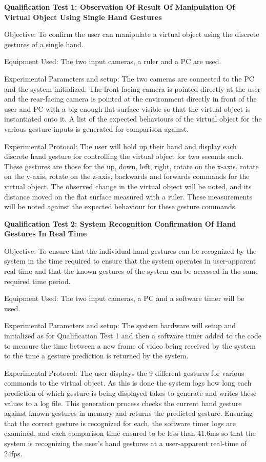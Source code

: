 \textbf{Qualification Test 1: Observation Of Result Of Manipulation Of Virtual Object Using Single Hand Gestures}

Objective: To confirm the user can manipulate a virtual object using the discrete gestures of a single hand.
 
Equipment Used: The two input cameras, a ruler and a PC are used.

Experimental Parameters and setup: The two cameras are connected to the PC and the system initialized. The front-facing camera is pointed directly at the user and the rear-facing camera is pointed at the environment directly in front of the user and PC with a big enough flat surface visible so that the virtual object is instantiated onto it. A list of the expected behaviours of the virtual object for the various gesture inputs is generated for comparison against.

Experimental Protocol: The user will hold up their hand and display each discrete hand gesture for controlling the virtual object for two seconds each. These gestures are those for the up, down, left, right, rotate on the x-axis, rotate on the y-axis, rotate on the z-axis, backwards and forwards commands for the virtual object. The observed change in the virtual object will be noted, and its distance moved on the flat surface measured with a ruler. These measurements will be noted against the expected behaviour for these gesture commands.

\textbf{Qualification Test 2: System Recognition Confirmation Of Hand Gestures In Real Time}

Objective: To ensure that the individual hand gestures can be recognized by the system in the time required to ensure that the system operates in user-apparent real-time and that the known gestures of the system can be accessed in the same required time period.

Equipment Used: The two input cameras, a PC and a software timer will be used.

Experimental Parameters and setup: The system hardware will setup and initialized as for Qualification Test 1 and then a software timer added to the code to measure the time between a new frame of video being received by the system to the time a gesture prediction is returned by the system.

Experimental Protocol: The user displays the 9 different gestures for various commands to the virtual object. As this is done the system logs how long each prediction of which gesture is being displayed takes to generate and writes these values to a log file. This generation process checks the current hand gesture against known gestures in memory and returns the predicted gesture. Ensuring that the correct gesture is recognized for each, the software timer logs are examined, and each comparison time ensured to be less than 41.6ms so that the system is recognizing the user's hand gestures at a user-apparent real-time of 24fps.

